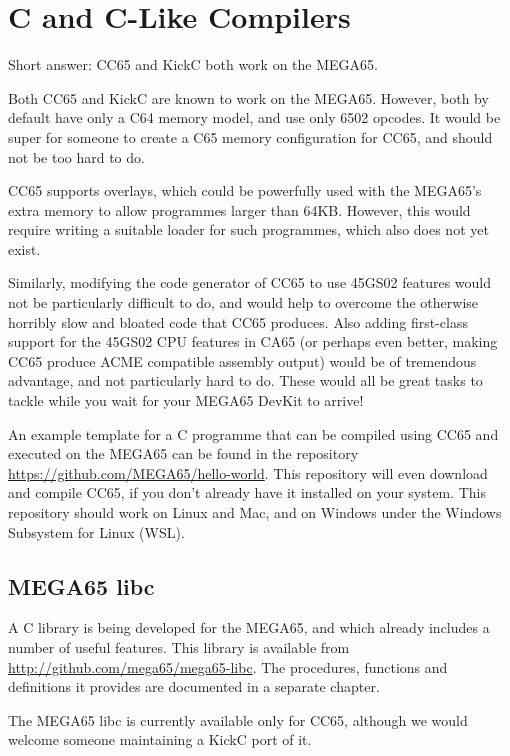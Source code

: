\chapter{C and C-Like Compilers}

Short answer: CC65 and KickC both work on the MEGA65.

Both CC65 and KickC are known to work on the MEGA65.  However, both by
default have only a C64 memory model, and use only 6502 opcodes.
It would be super for someone to create a C65 memory configuration for
CC65, and should not be too hard to do.

CC65 supports overlays, which
could be powerfully used with the MEGA65's extra memory to allow
programmes larger than 64KB.  However, this would require writing a
suitable loader for such programmes, which also does not yet exist.

Similarly, modifying the code
generator of CC65 to use 45GS02 features would not be particularly
difficult to do, and would help to overcome the otherwise horribly
slow and bloated code that CC65 produces.  Also adding first-class
support for the 45GS02 CPU features in CA65 (or perhaps even better,
making CC65 produce ACME compatible assembly output) would be of
tremendous advantage, and not particularly hard to do.  These would
all be great tasks to tackle while you wait for your MEGA65 DevKit to
arrive!

An example template for a C programme that can be compiled using CC65
and executed on the MEGA65 can be found in the repository
\url{https://github.com/MEGA65/hello-world}.  This repository will
even download and compile CC65, if you don't already have it installed
on your system.  This repository should work on Linux and Mac, and
on Windows under the Windows Subsystem for Linux (WSL).

\section{MEGA65 libc}

A C library is being developed for the MEGA65, and which already
includes a number of useful features. This library is available from
\url{http://github.com/mega65/mega65-libc}. The procedures,
functions and definitions it provides are documented in a separate
chapter.

The MEGA65 libc is currently available only for CC65, although we would
welcome someone maintaining a KickC port of it.
